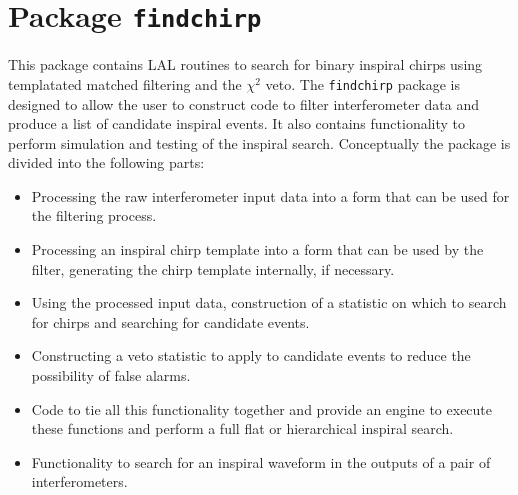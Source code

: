\newcommand{\ospsd}{\ensuremath{S\left(\left|f_{k}\right|\right)}}

\chapter{Package \texttt{findchirp}}

This package contains LAL routines to search for binary inspiral chirps
using templatated matched filtering and the $\chi^2$ veto. The
\texttt{findchirp} package is designed to allow the user to construct code to
filter interferometer data and produce a list of candidate inspiral events. It
also contains functionality to perform simulation and testing of the inspiral
search. Conceptually the package is divided into the following parts:

\begin{itemize}
\item Processing the raw interferometer input data into a form that can be
used for the filtering process.

\item Processing an inspiral chirp template into a form that can be used by
the filter, generating the chirp template internally, if necessary.

\item Using the processed input data, construction of a statistic on which to
search for chirps and searching for candidate events.

\item Constructing a veto statistic to apply to candidate events to reduce the
possibility of false alarms.

\item Code to tie all this functionality together and provide an engine to
execute these functions and perform a full flat or hierarchical inspiral
search.

\item Functionality to search for an inspiral waveform in the outputs of a
pair of interferometers.
\end{itemize}

